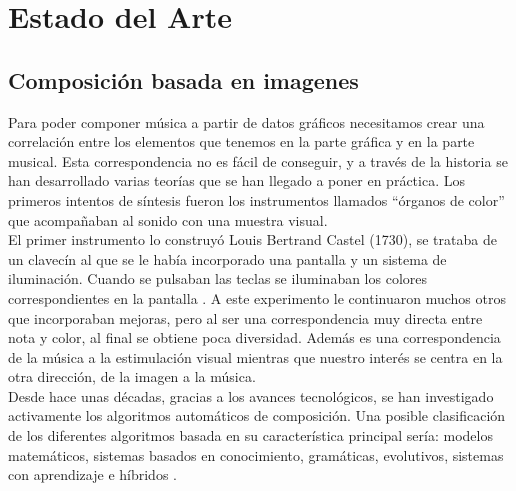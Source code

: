 \section{Estado del Arte}
\label{sec:estadodelarte}



\subsection{Composición basada en imagenes}


Para poder componer música a partir de datos gráficos necesitamos crear una correlación entre los elementos que tenemos en la parte gráfica y en la parte musical. Esta correspondencia no es fácil de conseguir, y a través de la historia se han desarrollado varias teorías que se han llegado a poner en práctica. Los primeros intentos de síntesis fueron los instrumentos llamados ``órganos de color'' que acompañaban al sonido con una muestra visual.\\

El primer instrumento lo construyó Louis Bertrand Castel (1730), se trataba de un clavecín al que se le había incorporado una pantalla y un sistema de iluminación. Cuando se pulsaban las teclas se iluminaban los colores correspondientes en la pantalla \cite{organosColor}. A este experimento le continuaron muchos otros que incorporaban mejoras, pero al ser una correspondencia muy directa entre nota y color, al final se obtiene poca diversidad. Además es una correspondencia de la música a la estimulación visual mientras que nuestro interés se centra en la otra dirección, de la imagen a la música.\\

Desde hace unas décadas, gracias a los avances tecnológicos, se han investigado activamente los algoritmos automáticos de composición. Una posible clasificación de los diferentes algoritmos basada en su característica principal sería: modelos matemáticos, sistemas basados en conocimiento, gramáticas, evolutivos, sistemas con aprendizaje e híbridos \cite{AIMethodsForComposition}.


